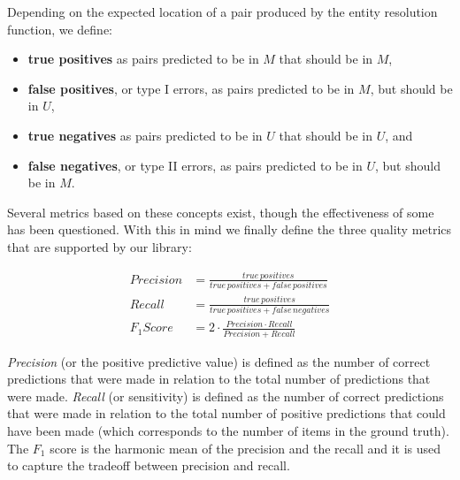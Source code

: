 \documentclass[11pt]{article}
\begin{document}
    Depending on the expected location of a pair produced by the entity
    resolution function, we define:

    \begin{itemize}
        \item \textbf{true positives} as pairs predicted to be in $M$ that
        should be in $M$,
        \item \textbf{false positives}, or type I errors, as pairs predicted to
        be in $M$, but should be in $U$,
        \item \textbf{true negatives} as pairs predicted to be in $U$ that
        should be in $U$, and
        \item \textbf{false negatives}, or type II errors, as pairs predicted to
        be in $U$, but should be in $M$.
    \end{itemize}

    Several metrics based on these concepts exist, though the effectiveness of
    some has been questioned\cite{Goga2015}.
    With this in mind we finally define the three quality metrics that are
    supported by our library:

    \begin{align}
    Precision&=\frac{true\,positives}{true\,positives + false\,positives} \\
    Recall&=\frac{true\,positives}{true\,positives + false\,negatives} \\
    F_1 Score&=2 \cdot \frac{Precision \cdot Recall}{Precision+Recall}
    \end{align}

    \textit{Precision} (or the positive predictive value) is defined as the
    number of correct predictions that were made in relation to the total number
    of predictions that were made.
    \textit{Recall} (or sensitivity) is defined as the number of correct
    predictions that were made in relation to the total number of positive
    predictions that could have been made (which corresponds to the number of
    items in the ground truth).
    The \textit{$F_1$} score is the harmonic mean of the precision and the
    recall and it is used to capture the tradeoff between precision and
    recall\cite{hitesh2012}.
\end{document}
